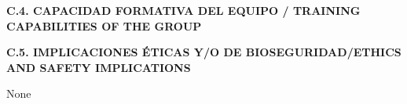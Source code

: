 \documentclass[a4paper,11pt,oneside]{article}
\begin{document}

%
%
%
%

\vspace{12pt}

\noindent\textbf{C.4. CAPACIDAD FORMATIVA DEL EQUIPO / TRAINING CAPABILITIES OF THE GROUP}


%
%
%
%


\vspace{12pt}

\noindent\textbf{C.5. IMPLICACIONES ÉTICAS Y/O DE BIOSEGURIDAD/ETHICS AND SAFETY IMPLICATIONS}

None
\end{document}
